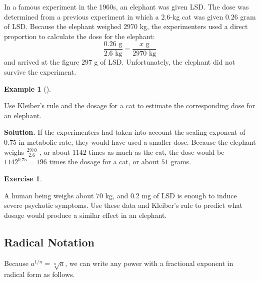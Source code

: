 \documentclass[10pt,]{book}
\theoremstyle{plain}
\theoremstyle{definition}
\theoremstyle{definition}
\theoremstyle{definition}
\newtheorem{example}[theorem]{Example}
\theoremstyle{definition}
\theoremstyle{definition}
\newtheorem{exercise}[theorem]{Exercise}
\numberwithin{equation}{section}
\begin{document}
    In a famous experiment in the 1960s, an elephant was given LSD. The dose was determined from a previous experiment in which a \(2.6\)-kg cat was given \(0.26\) gram of LSD. Because the elephant weighed \(2970\) kg, the experimenters used a direct proportion to calculate the dose for the elephant:
    \begin{equation*}\frac{0.26 \text{ g}}{2.6 \text{ kg}}= \frac{x \text{ g}}{2970 \text{ kg}}\end{equation*}
    and arrived at the figure \(297\) g of LSD. Unfortunately, the elephant did not survive the experiment.
%
\begin{example}[]\label{example-Kleiber-elephant-LSD-dose}

    Use Kleiber's rule and the dosage for a cat to estimate the corresponding dose for an elephant.
%
\par\medskip\noindent%
\textbf{Solution.}\quad 
    If the experimenters had taken into account the scaling exponent of \(0.75\) in metabolic rate, they would have used a smaller dose. Because the elephant weighs \(\frac{2970}{2.6}\) , or about \(1142\) times as much as the cat, the dose would be \(1142^{0.75} = 196\) times the dosage for a cat, or about \(51\) grams.
%
\end{example}
\begin{exercise}\label{exercise-LSD-human-vs-elephant-dose}

    A human being weighs about \(70\) kg, and \(0.2\) mg of LSD is enough to induce severe psychotic symptoms. Use these data and Kleiber's rule to predict what dosage would produce a similar effect in an elephant.
\end{exercise}
\typeout{************************************************}
\typeout{************************************************}
\subsection[Radical Notation]{Radical Notation}\label{subsection-78}
\index{}
        Because \(a^{1/n} = \sqrt[n]{a}\), we can write any power with a fractional exponent in radical form as follows.
\typeout{************************************************}
\typeout{************************************************}
\end{document}
